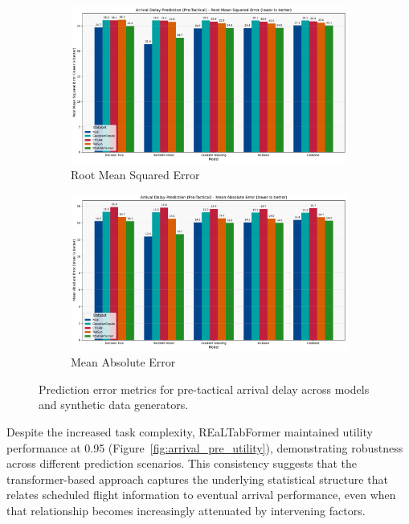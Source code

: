 \documentclass[conference]{IEEEtran}
\begin{document}
\begin{figure}[htbp]
    \centering
    \begin{subfigure}[b]{0.49\textwidth}
        \includegraphics[width=\linewidth]{plots/arrival_delay_min_pre-tactical/arrival_delay_min_pre-tactical_rmse.pdf}
        \caption{Root Mean Squared Error}
        \label{fig:arrival_pre_rmse}
    \end{subfigure}
    \hfill
    \begin{subfigure}[b]{0.49\textwidth}
        \includegraphics[width=\linewidth]{plots/arrival_delay_min_pre-tactical/arrival_delay_min_pre-tactical_mae.pdf}
        \caption{Mean Absolute Error}
        \label{fig:arrival_pre_mae}
    \end{subfigure}
    \caption{Prediction error metrics for pre-tactical arrival delay across models and synthetic data generators.}
\end{figure}

Despite the increased task complexity, REaLTabFormer maintained  utility performance at 0.95 (Figure~\ref{fig:arrival_pre_utility}), demonstrating robustness across different prediction scenarios. This consistency suggests that the transformer-based approach captures the underlying statistical structure that relates scheduled flight information to eventual arrival performance, even when that relationship becomes increasingly attenuated by intervening factors.
\end{document}

